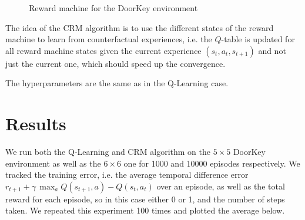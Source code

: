 \documentclass[12pt, a4paper]{article}
\begin{document}
\usetikzlibrary{graphs, quotes}
\begin{figure}[h]
	\centering
	\caption{Reward machine for the DoorKey environment}
	\label{fig:rm}
\end{figure}

The idea of the CRM algorithm is to use the different states of the reward machine to learn from counterfactual experiences, i.e. the $Q$-table is updated for all reward machine states given the current experience $(s_t, a_t, s_{t+1})$ and not just the current one, which should speed up the convergence.

The hyperparameters are the same as in the Q-Learning case.

\section*{Results}

We run both the Q-Learning and CRM algorithm on the $5 \times 5$ DoorKey environment as well as the $6 \times 6$ one for 1000 and 10000 episodes respectively. We tracked the training error, i.e. the average temporal difference error $r_{t+1} + \gamma \, \max_a Q(s_{t+1}, a) - Q(s_t, a_t)$ over an episode, as well as the total reward for each episode, so in this case either 0 or 1, and the number of steps taken. We repeated this experiment 100 times and plotted the average below.
\end{document}
